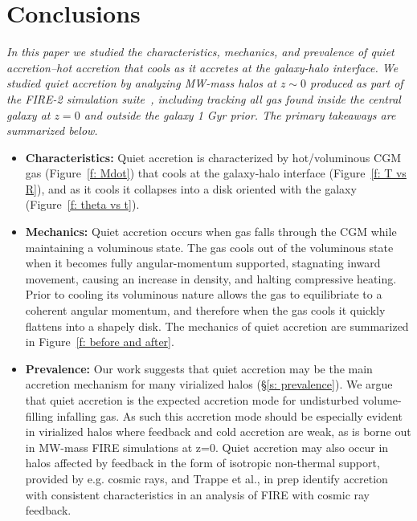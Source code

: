 \documentclass[fleqn,usenatbib]{mnras}
\begin{document}

\section{Conclusions}
\label{s: conclusions}

\textit{
In this paper we studied the characteristics, mechanics, and prevalence of quiet accretion--hot accretion that cools as it accretes at the galaxy-halo interface.
We studied quiet accretion by analyzing MW-mass halos at $z \sim 0$ produced as part of the FIRE-2 simulation suite~\cite{Hopkins2018}, including tracking all gas found inside the central galaxy at $z=0$ and outside the galaxy 1 Gyr prior.
The primary takeaways are summarized below.
}
\begin{itemize}
    \item \textbf{Characteristics:} Quiet accretion is characterized by hot/voluminous CGM gas (Figure~\ref{f: Mdot}) that cools at the galaxy-halo interface (Figure~\ref{f: T vs R}), and as it cools it collapses into a disk oriented with the galaxy (Figure~\ref{f: theta vs t}).
    \item \textbf{Mechanics:} Quiet accretion occurs when gas falls through the CGM while maintaining a voluminous state.
    The gas cools out of the voluminous state when it becomes fully angular-momentum supported, stagnating inward movement, causing an increase in density, and halting compressive heating.
    Prior to cooling its voluminous nature allows the gas to equilibriate to a coherent angular momentum, and therefore when the gas cools it quickly flattens into a shapely disk.
    The mechanics of quiet accretion are summarized in Figure~\ref{f: before and after}.
    \item \textbf{Prevalence:} Our work suggests that quiet accretion may be the main accretion mechanism for many virialized halos (\S\ref{s: prevalence}).
    We argue that quiet accretion is the expected accretion mode for undisturbed volume-filling infalling gas.
    As such this accretion mode should be especially evident in virialized halos where feedback and cold accretion are weak, as is borne out in MW-mass FIRE simulations at z=0.
    Quiet accretion may also occur in halos affected by feedback in the form of isotropic non-thermal support, provided by e.g. cosmic rays, and Trappe et al., in prep identify accretion with consistent characteristics in an analysis of FIRE with cosmic ray feedback.
\end{itemize}
\end{document}
